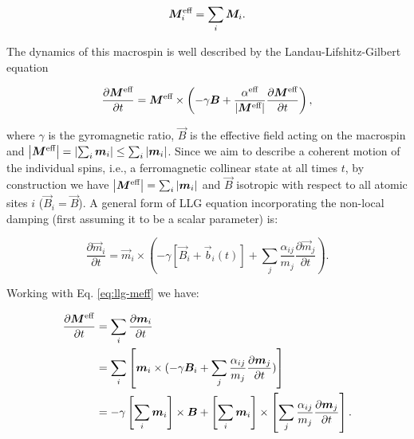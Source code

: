 \begin{equation}\label{eq:sum-damping}
\begin{split}
\vec{M}^{\textnormal{eff}}_i =\sum_i \vec{M}_i.
\end{split}
\end{equation}

The dynamics of this macrospin is well described by the Landau-Lifshitz-Gilbert equation 

\begin{equation}\label{eq:llg-meff}
\frac{\partial \vec{M}^{\textnormal{eff}}}{\partial t}=\vec{M^{\textnormal{eff}}}\times\left(-\gamma\vec{B}+\frac{\alpha^{\textnormal{eff}}}{\left|\vec{M}^{\textnormal{eff}}\right|} \frac{\partial \vec{M}^{\textnormal{eff}}}{\partial t}\right),
\end{equation}

\noindent where $\gamma$ is the gyromagnetic ratio, $\vec{B}$ is the effective field acting on the macrospin and $\left|\vec{M}^{\textnormal{eff}}\right|=\left|\sum_i\vec{m}_i\right|\leq\sum_i\left|\vec{m}_{i}\right|$. Since we aim to describe a coherent motion of the individual spins, i.e., a ferromagnetic collinear state at all times $t$, by construction we have $\left|\vec{M}^{\textnormal{eff}}\right|=\sum_i\left|\vec{m}_{i}\right|$  and $\vec{B}$ isotropic with respect to all atomic sites $i$ ($\vec{B}_i=\vec{B}$). A general form of LLG equation incorporating the non-local damping (first assuming it to be a scalar parameter) is:

\begin{equation}\label{eq:llg_nonlocal}
\frac{\partial \vec{m}_i}{\partial t}=\vec{m}_i\times\left(-\gamma \left[\vec{B}_i+\vec{b}_i(t)\right]+\sum_j\frac{\alpha_{ij}}{m_j}\frac{\partial \vec{m}_j}{\partial t}\right).
\end{equation}

Working with Eq. \ref{eq:llg-meff} we have:

\begin{align}\label{eq:meff-deduction}
\frac{\partial \vec{M}^{\textnormal{eff}}}{\partial t}
&=\sum_i \frac{\partial \vec{m}_i}{\partial t} \nonumber\\
&=\sum_i\left[\vec{m}_i\times(-\gamma \vec{B}_i+\sum_j\frac{\alpha_{ij}}{m_j} \frac{\partial \vec{m}_j}{\partial t} )\right] \nonumber\\
&=-\gamma \left[\sum_i\vec{m}_i\right]\times \vec{B}+\left[\sum_i{\vec{m}_i}\right]\times \left[\sum_j\frac{\alpha_{ij}}{m_j}\frac{\partial \vec{m}_j}{\partial t}\right].
\end{align}

